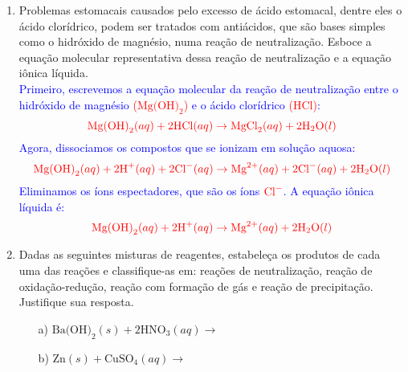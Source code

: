 \documentclass[a4paper, 12pt]{article}
\begin{document}
\begin{enumerate}
\begin{enumerate}[align=left, labelsep=-0.5em]

          \end{enumerate}




    \item Problemas estomacais causados pelo excesso de ácido estomacal, dentre
          eles o ácido clorídrico, podem ser tratados com antiácidos, que são bases
          simples como o hidróxido de magnésio, numa reação de neutralização. Esboce
          a equação molecular representativa dessa reação de neutralização e a
          equação iônica líquida.
          \\[10pt]
          \textcolor{blue}{Primeiro, escrevemos a equação molecular da reação de neutralização entre o hidróxido de magnésio \textcolor{red}{(\(\text{Mg(OH)}_2\))} e o ácido clorídrico \textcolor{red}{(\(\text{HCl}\))}:}
          \[
              \textcolor{red}{\text{Mg(OH)}_2 (aq) + 2\text{HCl} (aq) \rightarrow \text{MgCl}_2 (aq) + 2\text{H}_2\text{O} (l)}
          \]
          \textcolor{blue}{Agora, dissociamos os compostos que se ionizam em solução aquosa:}
          \[
              \textcolor{red}{\text{Mg(OH)}_2 (aq) + 2\text{H}^+ (aq) + 2\text{Cl}^- (aq) \rightarrow \text{Mg}^{2+} (aq) + 2\text{Cl}^- (aq) + 2\text{H}_2\text{O} (l)}
          \]
          \textcolor{blue}{Eliminamos os íons espectadores, que são os íons \(\textcolor{red}{\text{Cl}^-}\). A equação iônica líquida é:}
          \[
              \textcolor{red}{\text{Mg(OH)}_2 (aq) + 2\text{H}^+ (aq) \rightarrow \text{Mg}^{2+} (aq) + 2\text{H}_2\text{O} (l)}
          \]



    \item Dadas as seguintes misturas de reagentes, estabeleça os produtos de
          cada uma das reações e classifique-as em: reações de neutralização, reação
          de oxidação-redução, reação com formação de gás e reação de precipitação.
          Justifique sua resposta.
          \begin{enumerate}[align=left, labelsep=-0.5em]
              \item[a)] $\text{Ba(OH)}_{2}(s) + 2\text{HNO}_{3}(aq) \rightarrow$

              \item[b)] $\text{Zn}(s) + \text{CuSO}_{4}(aq) \rightarrow$


\end{enumerate}
\end{enumerate}
\end{document}
